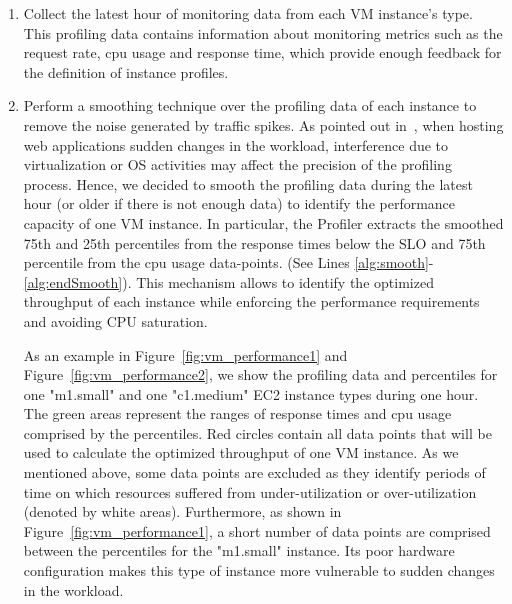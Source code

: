 \begin{enumerate}
\item Collect the latest hour of monitoring data from each VM instance's type. This profiling data contains information about monitoring metrics such as the request rate, cpu usage and response time, which provide enough feedback for the definition of instance profiles. 

\item Perform a smoothing technique over the profiling data of each instance to remove the noise generated by traffic spikes. As pointed out in~\cite{gandhi_hybrid_2012}, when hosting web applications sudden changes in the workload, interference due to virtualization or OS activities may affect the precision of the profiling process. Hence, we decided to smooth the profiling data during the latest hour (or older if there is not enough data) to identify the performance capacity of one VM instance. In particular, the Profiler extracts the smoothed 75th and 25th percentiles from the response times below the SLO and 75th percentile from the cpu usage data-points. (See Lines \ref{alg:smooth}-\ref{alg:endSmooth}). This mechanism allows to identify the optimized throughput of each instance while enforcing the performance requirements and avoiding CPU saturation. 

As an example in Figure~\ref{fig:vm_performance1} and Figure~\ref{fig:vm_performance2}, we show the profiling data and percentiles for one "m1.small" and one "c1.medium" EC2 instance types during one hour. The green areas represent the ranges of response times and cpu usage comprised by the percentiles. Red circles contain all data points that will be used to calculate the optimized throughput of one VM instance. As we mentioned above, some data points are excluded as they identify periods of time on which resources suffered from under-utilization or over-utilization (denoted by white areas). Furthermore, as shown in Figure~\ref{fig:vm_performance1}, a short number of data points are comprised between the percentiles for the "m1.small" instance. Its poor hardware configuration makes this type of instance more vulnerable to sudden changes in the workload.




\end{enumerate}
